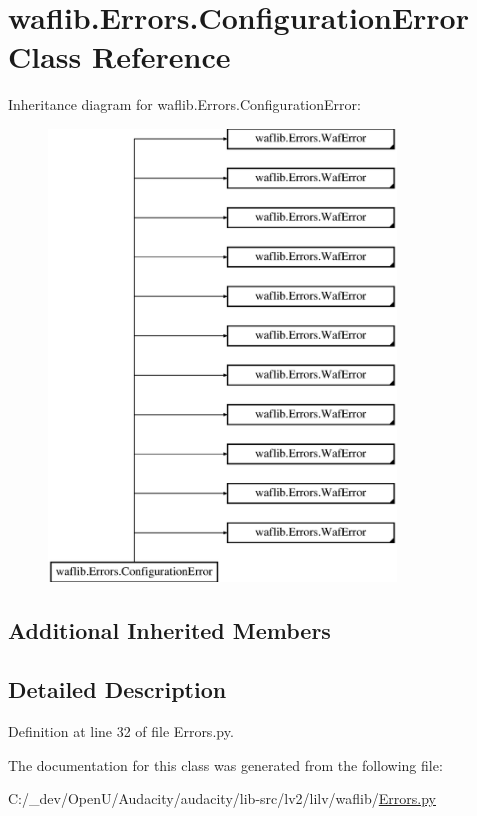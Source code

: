 \hypertarget{classwaflib_1_1_errors_1_1_configuration_error}{}\section{waflib.\+Errors.\+Configuration\+Error Class Reference}
\label{classwaflib_1_1_errors_1_1_configuration_error}
Inheritance diagram for waflib.\+Errors.\+Configuration\+Error\+:\begin{figure}[H]
\begin{center}
\leavevmode
\includegraphics[height=12.000000cm]{classwaflib_1_1_errors_1_1_configuration_error}
\end{center}
\end{figure}
\subsection*{Additional Inherited Members}


\subsection{Detailed Description}


Definition at line 32 of file Errors.\+py.



The documentation for this class was generated from the following file\+:\begin{DoxyCompactItemize}
\item 
C\+:/\+\_\+dev/\+Open\+U/\+Audacity/audacity/lib-\/src/lv2/lilv/waflib/\hyperlink{lilv_2waflib_2_errors_8py}{Errors.\+py}\end{DoxyCompactItemize}
